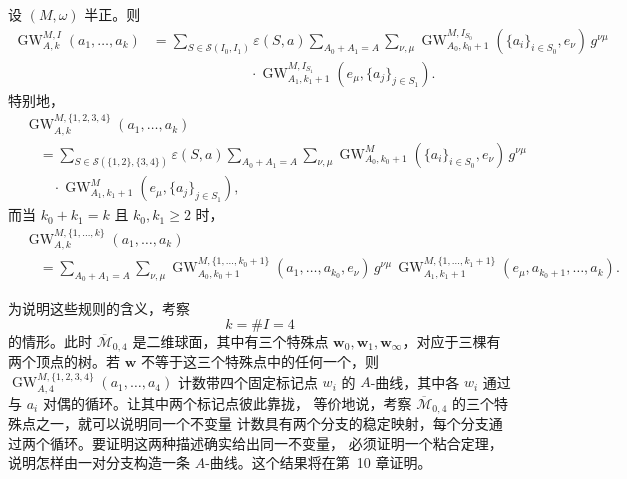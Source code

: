 \begin{theorem}[\BookRecordIndex{T0254}粘合]\label{thm:7-5-10}
设 $(M,\omega)$ 半正。则
\begin{align*}
  \operatorname{GW}_{A,k}^{M,I}(a_1,\ldots,a_k)
  &={}
  \sum_{S\in\mathcal S(I_0,I_1)}\varepsilon(S,a)
  \sum_{A_0+A_1=A}\sum_{\nu,\mu}
  \operatorname{GW}_{A_0,k_0+1}^{M,I_{S_0}}
     (\{a_i\}_{i\in S_0},e_\nu)\,g^{\nu\mu}\\
  &\hspace{7em}\cdot
  \operatorname{GW}_{A_1,k_1+1}^{M,I_{S_1}}
     (e_\mu,\{a_j\}_{j\in S_1}).
\end{align*}
特别地，
\begin{align*}
  &\operatorname{GW}_{A,k}^{M,\{1,2,3,4\}}(a_1,\ldots,a_k)\\
  &\quad={}
  \sum_{S\in\mathcal S(\{1,2\},\{3,4\})}\varepsilon(S,a)
  \sum_{A_0+A_1=A}\sum_{\nu,\mu}
  \operatorname{GW}_{A_0,k_0+1}^M(\{a_i\}_{i\in S_0},e_\nu)
  \,g^{\nu\mu}\\
  &\qquad\cdot
  \operatorname{GW}_{A_1,k_1+1}^M(e_\mu,\{a_j\}_{j\in S_1}),
\end{align*}
而当 $k_0+k_1=k$ 且 $k_0,k_1\ge2$ 时，
\begin{align*}
  &\operatorname{GW}_{A,k}^{M,\{1,\ldots,k\}}(a_1,\ldots,a_k)\\
  &\quad={}
  \sum_{A_0+A_1=A}\sum_{\nu,\mu}
  \operatorname{GW}_{A_0,k_0+1}^{M,\{1,\ldots,k_0+1\}}
     (a_1,\ldots,a_{k_0},e_\nu)\,g^{\nu\mu}\,
  \operatorname{GW}_{A_1,k_1+1}^{M,\{1,\ldots,k_1+1\}}
     (e_\mu,a_{k_0+1},\ldots,a_k).
\end{align*}
\end{theorem}

为说明这些规则的含义，考察
\[
  k=\#I=4
\]
的情形。此时 $\overline{\mathcal M}_{0,4}$ 是二维球面，其中有三个特殊点
$\mathbf w_0,\mathbf w_1,\mathbf w_\infty$，对应于三棵有两个顶点的树。若
$\mathbf w$ 不等于这三个特殊点中的任何一个，则
$\operatorname{GW}_{A,4}^{M,\{1,2,3,4\}}(a_1,\ldots,a_4)$ 计数带四个固定标记点
$w_i$ 的 $A$-曲线，其中各 $w_i$ 通过与 $a_i$ 对偶的循环。让其中两个标记点彼此靠拢，
等价地说，考察 $\overline{\mathcal M}_{0,4}$ 的三个特殊点之一，就可以说明同一个不变量
计数具有两个分支的稳定映射，每个分支通过两个循环。要证明这两种描述确实给出同一不变量，
必须证明一个粘合定理，说明怎样由一对分支构造一条 $A$-曲线。这个结果将在第~10 章证明。

